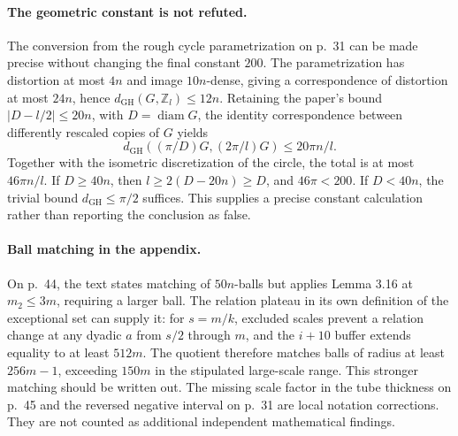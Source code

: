\documentclass[10pt]{article}
\begin{document}
\paragraph*{The geometric constant is not refuted.}\mbox{}\par
The conversion from the rough cycle parametrization on p. 31 can be made precise without changing the final constant \(200\). The parametrization has distortion at most \(4n\) and image \(10n\)-dense, giving a correspondence of distortion at most \(24n\), hence \(d_{\mathrm{GH}}(G,\mathbb Z_l)\le12n\). Retaining the paper’s bound \(|D-l/2|\le20n\), with \(D=\operatorname{diam}G\), the identity correspondence between differently rescaled copies of \(G\) yields \[d_{\mathrm{GH}}((\pi/D)G,(2\pi/l)G)\le20\pi n/l.\] Together with the isometric discretization of the circle, the total is at most \(46\pi n/l\). If \(D\ge40n\), then \(l\ge2(D-20n)\ge D\), and \(46\pi<200\). If \(D<40n\), the trivial bound \(d_{\mathrm{GH}}\le\pi/2\) suffices. This supplies a precise constant calculation rather than reporting the conclusion as false.\par
\paragraph*{Ball matching in the appendix.}\mbox{}\par
On p. 44, the text states matching of \(50n\)-balls but applies Lemma 3.16 at \(m_2\le3m\), requiring a larger ball. The relation plateau in its own definition of the exceptional set can supply it: for \(s=m/k\), excluded scales prevent a relation change at any dyadic \(a\) from \(s/2\) through \(m\), and the \(i+10\) buffer extends equality to at least \(512m\). The quotient therefore matches balls of radius at least \(256m-1\), exceeding \(150m\) in the stipulated large-scale range. This stronger matching should be written out. The missing scale factor in the tube thickness on p. 45 and the reversed negative interval on p. 31 are local notation corrections. They are not counted as additional independent mathematical findings.\par
\end{document}
